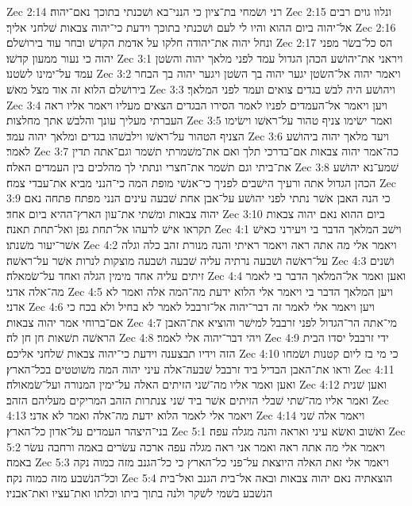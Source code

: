 Zec 2:14  רני ושׂמחי בת־ציון כי הנני־בא ושׁכנתי בתוכך נאם־יהוה׃
Zec 2:15  ונלוו גוים רבים אל־יהוה ביום ההוא והיו לי לעם ושׁכנתי בתוכך וידעת כי־יהוה צבאות שׁלחני אליך׃
Zec 2:16  ונחל יהוה את־יהודה חלקו על אדמת הקדשׁ ובחר עוד בירושׁלם׃
Zec 2:17  הס כל־בשׂר מפני יהוה כי נעור ממעון קדשׁו׃
Zec 3:1  ויראני את־יהושׁע הכהן הגדול עמד לפני מלאך יהוה והשׂטן עמד על־ימינו לשׂטנו׃
Zec 3:2  ויאמר יהוה אל־השׂטן יגער יהוה בך השׂטן ויגער יהוה בך הבחר בירושׁלם הלוא זה אוד מצל מאשׁ׃
Zec 3:3  ויהושׁע היה לבשׁ בגדים צואים ועמד לפני המלאך׃
Zec 3:4  ויען ויאמר אל־העמדים לפניו לאמר הסירו הבגדים הצאים מעליו ויאמר אליו ראה העברתי מעליך עונך והלבשׁ אתך מחלצות׃
Zec 3:5  ואמר ישׂימו צניף טהור על־ראשׁו וישׂימו הצניף הטהור על־ראשׁו וילבשׁהו בגדים ומלאך יהוה עמד׃
Zec 3:6  ויעד מלאך יהוה ביהושׁע לאמר׃
Zec 3:7  כה־אמר יהוה צבאות אם־בדרכי תלך ואם את־משׁמרתי תשׁמר וגם־אתה תדין את־ביתי וגם תשׁמר את־חצרי ונתתי לך מהלכים בין העמדים האלה׃
Zec 3:8  שׁמע־נא יהושׁע הכהן הגדול אתה ורעיך הישׁבים לפניך כי־אנשׁי מופת המה כי־הנני מביא את־עבדי צמח׃
Zec 3:9  כי הנה האבן אשׁר נתתי לפני יהושׁע על־אבן אחת שׁבעה עינים הנני מפתח פתחה נאם יהוה צבאות ומשׁתי את־עון הארץ־ההיא ביום אחד׃
Zec 3:10  ביום ההוא נאם יהוה צבאות תקראו אישׁ לרעהו אל־תחת גפן ואל־תחת תאנה׃
Zec 4:1  וישׁב המלאך הדבר בי ויעירני כאישׁ אשׁר־יעור משׁנתו׃
Zec 4:2  ויאמר אלי מה אתה ראה ויאמר ראיתי והנה מנורת זהב כלה וגלה על־ראשׁה ושׁבעה נרתיה עליה שׁבעה ושׁבעה מוצקות לנרות אשׁר על־ראשׁה׃
Zec 4:3  ושׁנים זיתים עליה אחד מימין הגלה ואחד על־שׂמאלה׃
Zec 4:4  ואען ואמר אל־המלאך הדבר בי לאמר מה־אלה אדני׃
Zec 4:5  ויען המלאך הדבר בי ויאמר אלי הלוא ידעת מה־המה אלה ואמר לא אדני׃
Zec 4:6  ויען ויאמר אלי לאמר זה דבר־יהוה אל־זרבבל לאמר לא בחיל ולא בכח כי אם־ברוחי אמר יהוה צבאות׃
Zec 4:7  מי־אתה הר־הגדול לפני זרבבל למישׁר והוציא את־האבן הראשׁה תשׁאות חן חן לה׃
Zec 4:8  ויהי דבר־יהוה אלי לאמר׃
Zec 4:9  ידי זרבבל יסדו הבית הזה וידיו תבצענה וידעת כי־יהוה צבאות שׁלחני אליכם׃
Zec 4:10  כי מי בז ליום קטנות ושׂמחו וראו את־האבן הבדיל ביד זרבבל שׁבעה־אלה עיני יהוה המה משׁוטטים בכל־הארץ׃
Zec 4:11  ואען ואמר אליו מה־שׁני הזיתים האלה על־ימין המנורה ועל־שׂמאולה׃
Zec 4:12  ואען שׁנית ואמר אליו מה־שׁתי שׁבלי הזיתים אשׁר ביד שׁני צנתרות הזהב המריקים מעליהם הזהב׃
Zec 4:13  ויאמר אלי לאמר הלוא ידעת מה־אלה ואמר לא אדני׃
Zec 4:14  ויאמר אלה שׁני בני־היצהר העמדים על־אדון כל־הארץ׃
Zec 5:1  ואשׁוב ואשׂא עיני ואראה והנה מגלה עפה׃
Zec 5:2  ויאמר אלי מה אתה ראה ואמר אני ראה מגלה עפה ארכה עשׂרים באמה ורחבה עשׂר באמה׃
Zec 5:3  ויאמר אלי זאת האלה היוצאת על־פני כל־הארץ כי כל־הגנב מזה כמוה נקה וכל־הנשׁבע מזה כמוה נקה׃
Zec 5:4  הוצאתיה נאם יהוה צבאות ובאה אל־בית הגנב ואל־בית הנשׁבע בשׁמי לשׁקר ולנה בתוך ביתו וכלתו ואת־עציו ואת־אבניו׃
